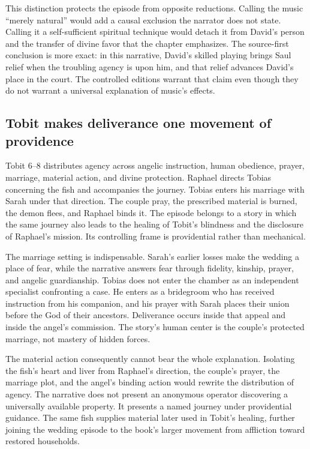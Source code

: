 This distinction protects the episode from opposite reductions. Calling the
music ``merely natural'' would add a causal exclusion the narrator does not
state. Calling it a self-sufficient spiritual technique would detach it from
David's person and the transfer of divine favor that the chapter emphasizes.
The source-first conclusion is more exact: in this narrative, David's skilled
playing brings Saul relief when the troubling agency is upon him, and that
relief advances David's place in the court. The controlled editions warrant
that claim even though they do not warrant a universal explanation of music's
effects.

\subsection{Tobit makes deliverance one movement of providence}

Tobit 6--8 distributes agency across angelic instruction, human obedience,
prayer, marriage, material action, and divine protection. Raphael directs
Tobias concerning the fish and accompanies the journey. Tobias enters his
marriage with Sarah under that direction. The couple pray, the prescribed
material is burned, the demon flees, and Raphael binds it. The episode belongs
to a story in which the same journey also leads to the healing of Tobit's
blindness and the disclosure of Raphael's mission. Its controlling frame is
providential rather than mechanical.

The marriage setting is indispensable. Sarah's earlier losses make the
wedding a place of fear, while the narrative answers fear through fidelity,
kinship, prayer, and angelic guardianship. Tobias does not enter the chamber
as an independent specialist confronting a case. He enters as a bridegroom
who has received instruction from his companion, and his prayer with Sarah
places their union before the God of their ancestors. Deliverance occurs
inside that appeal and inside the angel's commission. The story's human center
is the couple's protected marriage, not mastery of hidden forces.

The material action consequently cannot bear the whole explanation. Isolating
the fish's heart and liver from Raphael's direction, the couple's prayer, the
marriage plot, and the angel's binding action would rewrite the distribution
of agency. The narrative does not present an anonymous operator discovering
a universally available property. It presents a named journey under
providential guidance. The same fish supplies material later used in Tobit's
healing, further joining the wedding episode to the book's larger movement
from affliction toward restored households.

